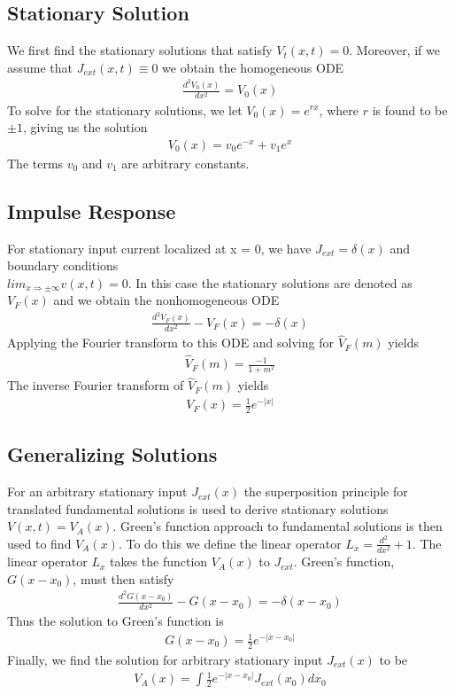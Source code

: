 \documentclass{article}
\begin{document}
\subsection{Stationary Solution}
We first find the stationary solutions that satisfy $V_t(x,t)=0$. Moreover, if we assume that $J_{ext}(x,t) \equiv 0$ we obtain the homogeneous ODE 
\begin{gather*}
    \frac{d^2V_0(x)}{d x^2} = V_0(x)
\end{gather*}
To solve for the stationary solutions, we let $V_0(x) = e^{rx}$, where $r$ is found to be $\pm1$, giving us the solution
\begin{gather*} 
V_0(x) = v_0e^{-x}+v_1e^{x}
\end{gather*}
The terms $v_0$ and $v_1$ are arbitrary constants. 

\subsection{Impulse Response}
For stationary input current localized at x = 0, we have $J_{ext}= \delta (x)$ and boundary conditions \\$lim_{x \Rightarrow \pm \infty}v(x,t) = 0$. In this case the stationary solutions are denoted as $V_F(x)$ and we obtain the nonhomogeneous ODE
\begin{gather*}
    \frac{d^2V_F(x)}{dx^2}-V_F(x)=-\delta(x)
\end{gather*}
Applying the Fourier transform to this ODE and solving for $\hat{V}_F(m)$ yields 
\begin{gather*}
    \hat V_F(m) = \frac{-1}{1+m^2}
\end{gather*}
The inverse Fourier transform \cite{fourierpairs} of $\hat{V}_F(m)$ yields
\begin{gather*} 
    V_F(x)=\frac{1}{2}e^{-|x|}
\end{gather*}

\subsection{Generalizing Solutions} 
For an arbitrary stationary input $J_{ext}(x)$ the  superposition principle for translated fundamental solutions is used to derive stationary solutions $V(x,t)=V_A(x)$. Green's function  approach to fundamental solutions \cite{greensfunc} is then used to find $V_A(x)$. To do this we define the linear operator $L_x=\frac{d^2}{dx^2}+1$. The linear operator $L_x$ takes the function $V_A(x)$ to $J_{ext}$. Green's function, $G(x-x_0)$, must then satisfy 
\begin{gather*}
    \frac{d^2G(x-x_0)}{dx^2}-G(x-x_0)=-\delta(x-x_0)
\end{gather*}
Thus the solution to Green's function is 
\begin{gather*}
    G(x-x_0)=\frac{1}{2}e^{-|x-x_0|}
\end{gather*}
Finally, we find the solution for arbitrary stationary input $J_{ext}(x)$ to be 
\begin{gather*}
    V_A(x)=\int\frac{1}{2}e^{-|x-x_0|}J_{ext}(x_0)dx_0
\end{gather*}
\end{document}
